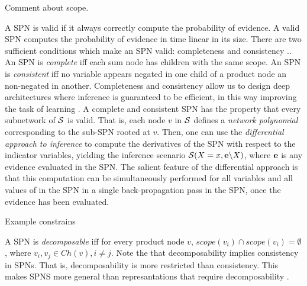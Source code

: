 Comment about scope.


A SPN is valid if it always correctly compute the probability of evidence.
A valid SPN computes the probability of evidence in time linear in its size.
There are two sufficient conditions which make an SPN valid: completeness and consistency \cite{poon2011sum}..
An SPN is \emph{complete} iff each sum node has children with the same scope.
An SPN is \emph{consistent} iff no variable appears negated in one child of a product node an non-negated in another.
Completeness and consistency allow us to design deep architectures where inference is guaranteed to be efficient, in this way improving the task of learning \cite{poon2011sum}. 
A complete and consistent SPN has the property that every subnetwork of $\cal S$ is valid.
That is, each node $v$ in $\cal S$ defines a \emph{network polynomial} \cite{poon2011sum} corresponding to the sub-SPN rooted at $v$.
Then, one can use the \emph{differential approach to inference} \cite{poon2011sum,darwiche2003differential,peharz2015theoretical} to compute the derivatives of the SPN with respect to the indicator variables, yielding the inference scenario ${\cal S}(X=x,{\bf e}\backslash X)$, where ${\bf e}$ is any evidence evaluated in the SPN.
The salient feature of the differential approach is that this computation can be simultaneously performed for all variables and all values of in the SPN in a single back-propagation pass in the SPN, once the evidence has been evaluated.


\begin{example}
Example constrains	
\end{example}

A SPN is \emph{decomposable} \cite{poon2011sum} iff for every product node $v$, $scope(v_i) \cap scope(v_i) = \emptyset$, where $v_i,v_j \in Ch(v), i\neq j$. 
Note the that decomposability implies consistency in SPNs.
That is, decomposability is more restricted than consistency.
This makes SPNS more general than represantations that require decomposability \cite{poon2011sum}.

